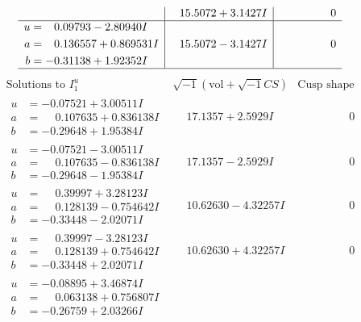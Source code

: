 \documentclass[1p]{elsarticle_modified}
\theoremstyle{definition}
\newcommand{\I}{\sqrt{-1}}
\begin{document}
$$\begin{array}{c|c|c}
 & \phantom{-}15.5072 + 3.1427 I & \phantom{-0.000000 } 0 \\ \hline\begin{aligned}
u &= \phantom{-}0.09793 - 2.80940 I \\
a &= \phantom{-}0.136557 + 0.869531 I \\
b &= -0.31138 + 1.92352 I\end{aligned}
 & \phantom{-}15.5072 - 3.1427 I & \phantom{-0.000000 } 0\\
 \hline 
 \end{array}$$\newpage$$\begin{array}{c|c|c}  
\text{Solutions to }I^u_{1}& \I (\text{vol} + \sqrt{-1}CS) & \text{Cusp shape}\\
 \hline 
\begin{aligned}
u &= -0.07521 + 3.00511 I \\
a &= \phantom{-}0.107635 + 0.836138 I \\
b &= -0.29648 + 1.95384 I\end{aligned}
 & \phantom{-}17.1357 + 2.5929 I & \phantom{-0.000000 } 0 \\ \hline\begin{aligned}
u &= -0.07521 - 3.00511 I \\
a &= \phantom{-}0.107635 - 0.836138 I \\
b &= -0.29648 - 1.95384 I\end{aligned}
 & \phantom{-}17.1357 - 2.5929 I & \phantom{-0.000000 } 0 \\ \hline\begin{aligned}
u &= \phantom{-}0.39997 + 3.28123 I \\
a &= \phantom{-}0.128139 - 0.754642 I \\
b &= -0.33448 - 2.02071 I\end{aligned}
 & \phantom{-}10.62630 - 4.32257 I & \phantom{-0.000000 } 0 \\ \hline\begin{aligned}
u &= \phantom{-}0.39997 - 3.28123 I \\
a &= \phantom{-}0.128139 + 0.754642 I \\
b &= -0.33448 + 2.02071 I\end{aligned}
 & \phantom{-}10.62630 + 4.32257 I & \phantom{-0.000000 } 0 \\ \hline\begin{aligned}
u &= -0.08895 + 3.46874 I \\
a &= \phantom{-}0.063138 + 0.756807 I \\
b &= -0.26759 + 2.03266 I\end{aligned}

\end{array}$$
\end{document}
